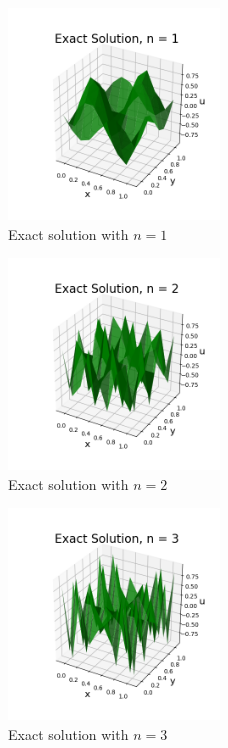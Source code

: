 \documentclass[12pt,a4paper]{report}
\begin{document}
		\begin{figure}[h]
			\centering
				\includegraphics[width=0.5\textwidth]{exn1.png}
				\caption{Exact solution with $n=1$}
		\end{figure}

		\begin{figure}[h]
			\centering
				\includegraphics[width=0.5\textwidth]{exn2.png}
				\caption{Exact solution with $n=2$}
		\end{figure}

		\begin{figure}[h]
			\centering
				\includegraphics[width=0.5\textwidth]{exn3.png}
				\caption{Exact solution with $n=3$}
		\end{figure}
\end{document}
